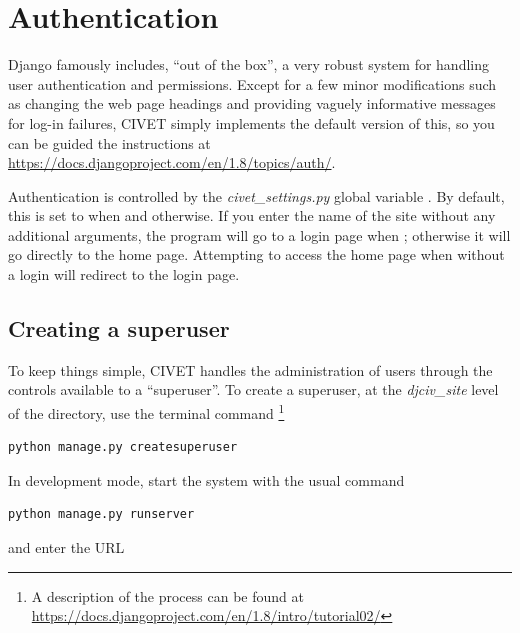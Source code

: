 \documentclass[letterpaper,10pt,english]{sphinxmanual}
\begin{document}
\chapter{Authentication}
\label{authentication:authentication}\label{authentication::doc}
Django famously includes, ``out of the box'', a very robust system for handling user authentication and permissions. Except
for a few minor modifications such as changing the web page headings and providing vaguely informative messages for log-in
failures, CIVET simply implements the default version of this, so you can be guided the instructions at
\href{https://docs.djangoproject.com/en/1.8/topics/auth/}{https://docs.djangoproject.com/en/1.8/topics/auth/}.

Authentication is controlled by the \emph{civet\_settings.py} global variable . By default, this is set to
 when  and  otherwise. If you enter the name of the site without any additional
arguments, the program will go to a login page when ; otherwise it will go
directly to the home page.
Attempting to access the home page when  without a login will redirect to the login page.


\section{Creating a superuser}
\label{authentication:creating-a-superuser}
To keep things simple, CIVET handles the administration of users through the controls available to a “superuser”.
To create a superuser, at the \emph{djciv\_site} level of the directory, use the terminal command \footnote{
A description of the process can be found at \href{https://docs.djangoproject.com/en/1.8/intro/tutorial02/}{https://docs.djangoproject.com/en/1.8/intro/tutorial02/}
}

\begin{Verbatim}[commandchars=\\\{\}]
python manage.py createsuperuser
\end{Verbatim}

In development mode, start the system with the usual command

\begin{Verbatim}[commandchars=\\\{\}]
python manage.py runserver
\end{Verbatim}

and enter the URL
\end{document}
